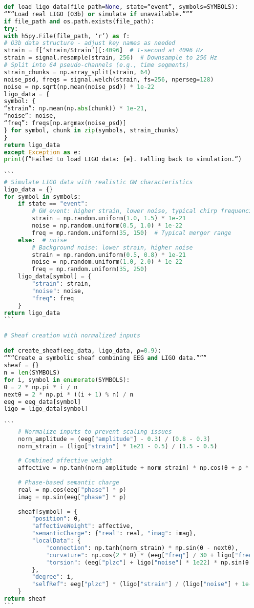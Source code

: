\documentclass[11pt]{article}
\begin{document}
\begin{lstlisting}[language=Python, caption={EEG-LIGO Combined Analysis - Complete Code}]
def load_ligo_data(file_path=None, state=“event”, symbols=SYMBOLS):
“”“Load real LIGO (O3b) or simulate if unavailable.”””
if file_path and os.path.exists(file_path):
try:
with h5py.File(file_path, ‘r’) as f:
# O3b data structure - adjust key names as needed
strain = f[‘strain/Strain’][:4096]  # 1-second at 4096 Hz
strain = signal.resample(strain, 256)  # Downsample to 256 Hz
# Split into 64 pseudo-channels (e.g., time segments)
strain_chunks = np.array_split(strain, 64)
noise_psd, freqs = signal.welch(strain, fs=256, nperseg=128)
noise = np.sqrt(np.mean(noise_psd)) * 1e-22
ligo_data = {
symbol: {
“strain”: np.mean(np.abs(chunk)) * 1e-21,
“noise”: noise,
“freq”: freqs[np.argmax(noise_psd)]
} for symbol, chunk in zip(symbols, strain_chunks)
}
return ligo_data
except Exception as e:
print(f”Failed to load LIGO data: {e}. Falling back to simulation.”)

```
# Simulate LIGO data with realistic GW characteristics
ligo_data = {}
for symbol in symbols:
    if state == "event":
        # GW event: higher strain, lower noise, typical chirp frequencies
        strain = np.random.uniform(1.0, 1.5) * 1e-21
        noise = np.random.uniform(0.5, 1.0) * 1e-22
        freq = np.random.uniform(35, 150)  # Typical merger range
    else:  # noise
        # Background noise: lower strain, higher noise
        strain = np.random.uniform(0.5, 0.8) * 1e-21
        noise = np.random.uniform(1.0, 2.0) * 1e-22
        freq = np.random.uniform(35, 250)
    ligo_data[symbol] = {
        "strain": strain,
        "noise": noise,
        "freq": freq
    }
return ligo_data
```

# Sheaf creation with normalized inputs

def create_sheaf(eeg_data, ligo_data, ρ=0.9):
“”“Create a symbolic sheaf combining EEG and LIGO data.”””
sheaf = {}
n = len(SYMBOLS)
for i, symbol in enumerate(SYMBOLS):
θ = 2 * np.pi * i / n
nextθ = 2 * np.pi * ((i + 1) % n) / n
eeg = eeg_data[symbol]
ligo = ligo_data[symbol]

```
    # Normalize inputs to prevent scaling issues
    norm_amplitude = (eeg["amplitude"] - 0.3) / (0.8 - 0.3)
    norm_strain = (ligo["strain"] * 1e21 - 0.5) / (1.5 - 0.5)
    
    # Combined affective weight
    affective = np.tanh(norm_amplitude + norm_strain) * np.cos(θ + ρ * np.pi)
    
    # Phase-based semantic charge
    real = np.cos(eeg["phase"] * ρ)
    imag = np.sin(eeg["phase"] * ρ)
    
    sheaf[symbol] = {
        "position": θ,
        "affectiveWeight": affective,
        "semanticCharge": {"real": real, "imag": imag},
        "localData": {
            "connection": np.tanh(norm_strain) * np.sin(θ - nextθ),
            "curvature": np.cos(2 * θ) * (eeg["freq"] / 30 + ligo["freq"] / 250) / 2,
            "torsion": (eeg["plzc"] + ligo["noise"] * 1e22) * np.sin(θ * ρ * 2) / 2
        },
        "degree": i,
        "selfRef": eeg["plzc"] * (ligo["strain"] / (ligo["noise"] + 1e-30))
    }
return sheaf
```


\end{lstlisting}
\end{document}
